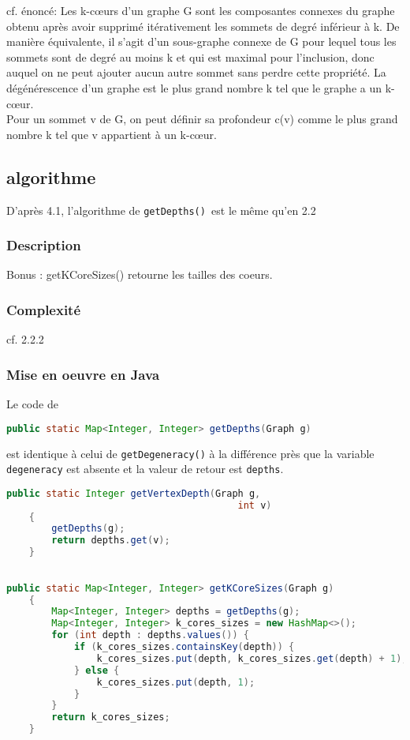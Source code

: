 cf. énoncé:
Les k-cœurs d’un graphe G sont les composantes connexes du graphe obtenu après avoir supprimé itérativement les sommets de degré inférieur à k. De manière équivalente, il s’agit d’un sous-graphe connexe de G pour lequel tous les sommets sont de degré au moins k et qui est maximal pour l’inclusion, donc auquel on ne peut ajouter aucun autre sommet sans perdre cette propriété. La dégénérescence d’un graphe est le plus grand nombre k tel que le graphe a un k-cœur. \\
Pour un sommet v de G, on peut définir sa profondeur c(v) comme le plus grand
nombre k tel que v appartient à un k-cœur.

\subsection{algorithme}

D'après 4.1, l'algorithme de \texttt{getDepths() }est le même qu'en 2.2 

\subsubsection{Description}
Bonus : getKCoreSizes() retourne les tailles des coeurs.

\subsubsection{Complexité}
cf. 2.2.2

\subsubsection{Mise en oeuvre en Java }

Le code de
\begin{lstlisting}[language=java]
public static Map<Integer, Integer> getDepths(Graph g)
\end{lstlisting}
est identique à celui de  \texttt{getDegeneracy()} à la différence près que la variable \texttt{degeneracy} est absente et la valeur de retour est \texttt{depths}.

\begin{lstlisting}[language=java]
public static Integer getVertexDepth(Graph g,
                                         int v)
    {
        getDepths(g);
        return depths.get(v);
    }
\end{lstlisting}
\begin{lstlisting}[language=java]

public static Map<Integer, Integer> getKCoreSizes(Graph g)
    {
        Map<Integer, Integer> depths = getDepths(g);
        Map<Integer, Integer> k_cores_sizes = new HashMap<>();
        for (int depth : depths.values()) {
            if (k_cores_sizes.containsKey(depth)) {
                k_cores_sizes.put(depth, k_cores_sizes.get(depth) + 1);
            } else {
                k_cores_sizes.put(depth, 1);
            }
        }
        return k_cores_sizes;
    }
\end{lstlisting}

